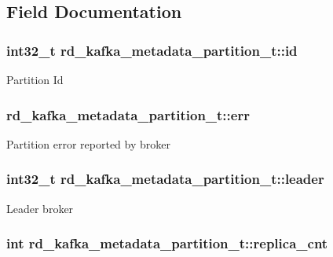 \subsection{Field Documentation}
\hypertarget{structrd__kafka__metadata__partition__t_ad76c23a795a752dfdea2ca69236e7f29}{
\subsubsection[{id}]{\setlength{\rightskip}{0pt plus 5cm}int32\_\-t {\bf rd\_\-kafka\_\-metadata\_\-partition\_\-t::id}}}
\label{structrd__kafka__metadata__partition__t_ad76c23a795a752dfdea2ca69236e7f29}
Partition Id \hypertarget{structrd__kafka__metadata__partition__t_abc667de1e28c6be4aece698806ca6e09}{
\subsubsection[{err}]{ {\bf rd\_\-kafka\_\-metadata\_\-partition\_\-t::err}}}
\label{structrd__kafka__metadata__partition__t_abc667de1e28c6be4aece698806ca6e09}
Partition error reported by broker \hypertarget{structrd__kafka__metadata__partition__t_a6c068b9f40bae19de020ce0c8cfc8053}{
\subsubsection[{leader}]{\setlength{\rightskip}{0pt plus 5cm}int32\_\-t {\bf rd\_\-kafka\_\-metadata\_\-partition\_\-t::leader}}}
\label{structrd__kafka__metadata__partition__t_a6c068b9f40bae19de020ce0c8cfc8053}
Leader broker \hypertarget{structrd__kafka__metadata__partition__t_a999ac89d23012cfc5ba8acc351300506}{
\subsubsection[{replica\_\-cnt}]{\setlength{\rightskip}{0pt plus 5cm}int {\bf rd\_\-kafka\_\-metadata\_\-partition\_\-t::replica\_\-cnt}}}
